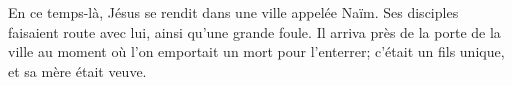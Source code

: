 En ce temps-là, Jésus se rendit dans une ville appelée Naïm.
	Ses disciples faisaient route avec lui, ainsi qu’une grande foule.
Il arriva près de la porte de la ville
	au moment où l’on emportait un mort pour l’enterrer;
	c’était un fils unique, et sa mère était veuve.
